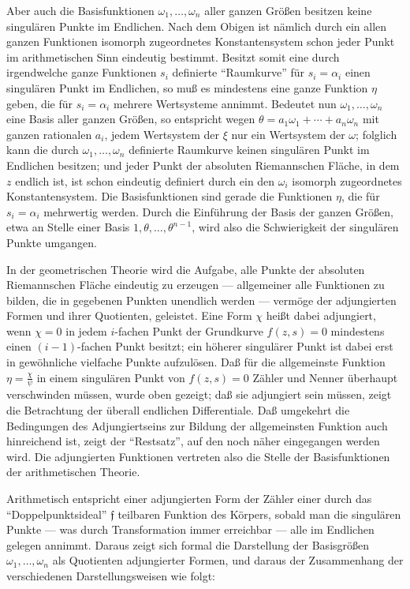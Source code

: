 \documentclass[12pt,a4paper]{article}
\begin{document}
Aber auch die Basisfunktionen $\omega_{1},\ldots,\omega_{n}$ aller ganzen Gr\"o\ss{}en besitzen keine singul\"aren Punkte im Endlichen. Nach dem Obigen ist n\"amlich durch ein allen ganzen Funktionen isomorph zugeordnetes Konstantensystem schon jeder Punkt im arithmetischen Sinn eindeutig bestimmt. Besitzt somit eine durch irgendwelche ganze Funktionen $s_{i}$ definierte ``Raumkurve'' f\"ur $s_{i}=\alpha_{i}$ einen singul\"aren Punkt im Endlichen, so mu\ss{} es mindestens eine ganze Funktion $\eta$ geben, die f\"ur $s_{i}=\alpha_{i}$ mehrere Wertsysteme annimmt. Bedeutet nun $\omega_{1},\ldots,\omega_{n}$ eine Basis aller ganzen Gr\"o\ss{}en, so entspricht wegen $\theta=a_{1}\omega_{1}+\cdots+a_{n}\omega_{n}$ mit ganzen rationalen $a_{i}$, jedem Wertsystem der $\xi$ nur ein Wertsystem der $\omega$; folglich kann die durch $\omega_{1},\ldots,\omega_{n}$ definierte Raumkurve keinen singul\"aren Punkt im Endlichen besitzen; und jeder Punkt der absoluten Riemannschen Fl\"ache, in dem $z$ endlich ist, ist schon eindeutig definiert durch ein den $\omega_{i}$ isomorph zugeordnetes Konstantensystem. Die Basisfunktionen sind gerade die Funktionen $\eta$, die f\"ur $s_{i}=\alpha_{i}$ mehrwertig werden. Durch die Einf\"uhrung der Basis der ganzen Gr\"o\ss{}en, etwa an Stelle einer Basis $1,\theta,\ldots,\theta^{n-1}$, wird also die Schwierigkeit der singul\"aren Punkte umgangen.

In der geometrischen Theorie wird die Aufgabe, alle Punkte der absoluten Riemannschen Fl\"ache eindeutig zu erzeugen --- allgemeiner alle Funktionen zu bilden, die in gegebenen Punkten unendlich werden --- verm\"oge der adjungierten Formen und ihrer Quotienten, geleistet. Eine Form $\chi$ hei\ss{}t dabei adjungiert, wenn $\chi=0$ in jedem $i$-fachen Punkt der Grundkurve $f(z,s)=0$ mindestens einen $(i-1)$-fachen Punkt besitzt; ein h\"oherer singul\"arer Punkt ist dabei erst in gew\"ohnliche vielfache Punkte aufzul\"osen. Da\ss{} f\"ur die allgemeinste Funktion $\eta=\frac{\chi}{\psi}$ in einem singul\"aren Punkt von $f(z,s)=0$ Z\"ahler und Nenner \"uberhaupt verschwinden m\"ussen, wurde oben gezeigt; da\ss{} sie adjungiert sein m\"ussen, zeigt die Betrachtung der \"uberall endlichen Differentiale. Da\ss{} umgekehrt die Bedingungen des Adjungiertseins zur Bildung der allgemeinsten Funktion auch hinreichend ist, zeigt der ``Restsatz'', auf den noch n\"aher eingegangen werden wird. Die adjungierten Funktionen vertreten also die Stelle der Basisfunktionen der arithmetischen Theorie.

Arithmetisch entspricht einer adjungierten Form der Z\"ahler einer durch das ``Doppelpunktsideal'' $\mathfrak{f}$ teilbaren Funktion des K\"orpers, sobald man die singul\"aren Punkte --- was durch Transformation immer erreichbar --- alle im Endlichen gelegen annimmt. Daraus zeigt sich formal die Darstellung der Basisgr\"o\ss{}en $\omega_{1},\ldots,\omega_{n}$ als Quotienten adjungierter Formen, und daraus der Zusammenhang der verschiedenen Darstellungsweisen wie folgt:
\end{document}
